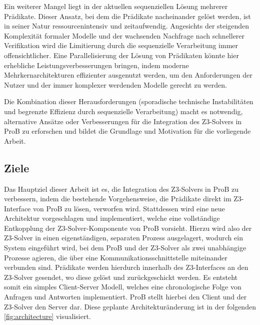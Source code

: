 Ein weiterer Mangel liegt in der aktuellen sequenziellen Lösung mehrerer Prädikate.
Dieser Ansatz, bei dem die Prädikate nacheinander gelöst werden,
ist in seiner Natur ressourcenintensiv und zeitaufwendig.
Angesichts der steigenden Komplexität formaler Modelle und der wachsenden Nachfrage nach schnellerer Verifikation wird die Limitierung durch die sequenzielle Verarbeitung immer offensichtlicher.
Eine Parallelisierung der Lösung von Prädikaten könnte hier erhebliche Leistungsverbesserungen bringen,
indem moderne Mehrkernarchitekturen effizienter ausgenutzt werden,
um den Anforderungen der Nutzer und der immer komplexer werdenden Modelle gerecht zu werden.

Die Kombination dieser Herausforderungen (sporadische technische Instabilitäten und begrenzte Effizienz durch sequenzielle Verarbeitung) macht es notwendig,
alternative Ansätze oder Verbesserungen für die Integration des Z3-Solvers in ProB zu erforschen und
bildet die Grundlage und Motivation für die vorliegende Arbeit.

\subsection{Ziele}
\label{sec:goals}

Das Hauptziel dieser Arbeit ist es, die Integration des Z3-Solvers in ProB zu verbessern,
indem die bestehende Vorgehensweise, die Prädikate direkt im Z3-Interface von ProB zu lösen, verworfen wird.
Stattdessen wird eine neue Architektur vorgeschlagen und implementiert,
welche eine vollständige Entkopplung der Z3-Solver-Komponente von ProB vorsieht.
Hierzu wird also der Z3-Solver in einen eigenständigen, separaten Prozess ausgelagert,
wodurch ein System eingeführt wird, bei dem ProB und der Z3-Solver als zwei unabhängige Prozesse agieren,
die über eine Kommunikationsschnittstelle miteinander verbunden sind.
Prädikate werden hierdurch innerhalb des Z3-Interfaces an den Z3-Solver gesendet, wo diese gelöst und zurückgeschickt werden.
Es entsteht somit ein simples Client-Server Modell, welches eine chronologische Folge von Anfragen und Antworten implementiert.
ProB stellt hierbei den Client und der Z3-Solver den Server dar.
Diese geplante Architekturänderung ist in der folgenden \cref{fig:architecture} visualisiert.
\vspace{2em}

